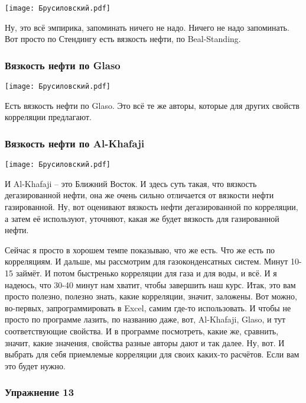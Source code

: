 \documentclass[main.tex]{subfiles}
\begin{document}
\begin{center}
\texttt{[image: Брусиловский.pdf]}
\end{center}

Ну, это всё эмпирика, запоминать ничего не надо.
Ничего не надо запоминать.
Вот просто по Стендингу есть вязкость нефти, по Beal-Standing.

\subsubsection{Вязкость нефти по Glaso}

\begin{center}
\texttt{[image: Брусиловский.pdf]}
\end{center}

Есть вязкость нефти по Glaso.
Это всё те же авторы, которые для других свойств корреляции предлагают.

\subsubsection{Вязкость нефти по Al-Khafaji}

\begin{center}
\texttt{[image: Брусиловский.pdf]}
\end{center}

И Al-Khafaji -- это Ближний Восток.
И здесь суть такая, что вязкость дегазированной нефти, она же очень сильно отличается от вязкости нефти газированной.
Ну, вот оценивают вязкость нефти дегазированной по корреляции, а затем её используют, уточняют, какая же будет вязкость для газированной нефти.

Сейчас я просто в хорошем темпе показываю, что же есть.
Что же есть по корреляциям.
И дальше, мы рассмотрим для газоконденсатных систем.
Минут 10-15 займёт.
И потом быстренько корреляции для газа и для воды, и всё.
И я надеюсь, что 30-40 минут нам хватит, чтобы завершить наш курс.
Итак, это вам просто полезно, полезно знать, какие корреляции, значит, заложены.
Вот можно, во-первых, запрограммировать в Excel, самим где-то использовать.
И чтобы не просто по программе лазить, по названию даже, вот, Al-Khafaji, Glaso, и тут соответствующие свойства.
И в программе посмотреть, какие же, сравнить, значит, какие значения, свойства разные авторы дают и так далее.
Ну, вот.
И выбрать для себя приемлемые корреляции для своих каких-то расчётов.
Если вам это будет нужно.

\subsubsection{Упражнение 13}
\end{document}
